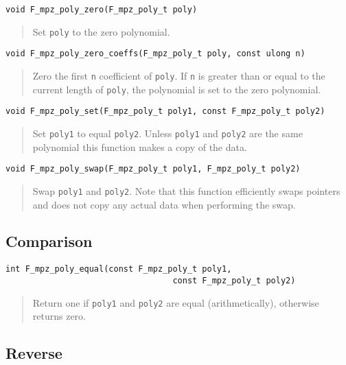 \documentclass[a4paper,10pt]{article}
\newcommand{\code}{\lstinline}
\begin{document}
\begin{lstlisting}
void F_mpz_poly_zero(F_mpz_poly_t poly)
\end{lstlisting}
\begin{quote}
Set \code{poly} to the zero polynomial.
\end{quote}

\begin{lstlisting}
void F_mpz_poly_zero_coeffs(F_mpz_poly_t poly, const ulong n)
\end{lstlisting}
\begin{quote}
Zero the first \code{n} coefficient of \code{poly}. If \code{n} is greater than or equal to the 
current length of \code{poly}, the polynomial is set to the zero polynomial.
\end{quote}

\begin{lstlisting}
void F_mpz_poly_set(F_mpz_poly_t poly1, const F_mpz_poly_t poly2)
\end{lstlisting}
\begin{quote}
Set \code{poly1} to equal \code{poly2}. Unless \code{poly1} and \code{poly2} are the same polynomial
this function makes a copy of the data.
\end{quote}

\begin{lstlisting}
void F_mpz_poly_swap(F_mpz_poly_t poly1, F_mpz_poly_t poly2)
\end{lstlisting}
\begin{quote}
Swap \code{poly1} and \code{poly2}. Note that this function efficiently swaps pointers and does
not copy any actual data when performing the swap.
\end{quote}

\subsection{Comparison}

\begin{lstlisting}
int F_mpz_poly_equal(const F_mpz_poly_t poly1, 
                                  const F_mpz_poly_t poly2)
\end{lstlisting}
\begin{quote}
Return one if \code{poly1} and \code{poly2} are equal (arithmetically), otherwise returns zero.
\end{quote}

\subsection{Reverse}
\end{document}
